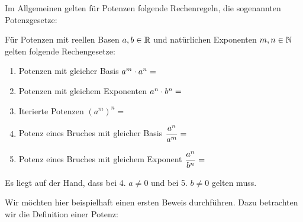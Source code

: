 \documentclass[11pt,oneside]{article}
\begin{document}
    Im Allgemeinen gelten für Potenzen folgende Rechenregeln, die sogenannten Potenzgesetze:\newpage
    \begin{satz}
    	Für Potenzen mit reellen Basen $a,b\in\mathbb{R}$ und natürlichen Exponenten $m,n\in\mathbb{N} $ gelten folgende Rechengesetze:
    	\begin{enumerate}
    		\item Potenzen mit gleicher Basis $a^{m}\cdot a^{n}=$
    		\item Potenzen mit gleichem Exponenten $a^{n}\cdot b^{n}=$
    		\item Iterierte Potenzen $(a^{m})^{n}=$
            \item Potenz eines Bruches mit gleicher Basis $\displaystyle\frac{a^n}{a^m}=$
            \item Potenz eines Bruches mit gleichem Exponent $\displaystyle\frac{a^n}{b^n}=$
        \end{enumerate}
        Es liegt auf der Hand, dass bei 4. $a\neq0$ und bei 5. $b\neq0$ gelten muss.
    \end{satz}
    \begin{beweis}
        Wir möchten hier beispielhaft einen ersten Beweis durchführen. Dazu betrachten wir die Definition einer Potenz:\vspace{5pt}\\
    \end{beweis}
\end{document}
